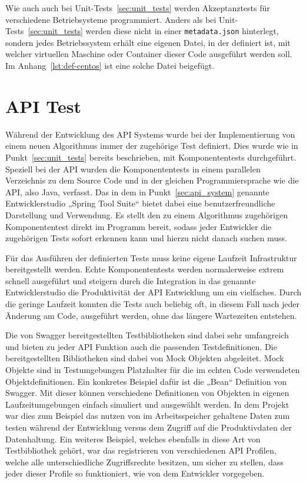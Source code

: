 Wie auch auch bei Unit-Tests~\ref{sec:unit_tests} werden Akzeptanztests für
verschiedene Betriebsysteme programmiert. Anders als bei
Unit-Tests~\ref{sec:unit_tests} werden diese nicht in einer
\texttt{metadata.json} hinterlegt, sondern jedes Betriebssystem erhält eine
eigenen Datei, in der definiert ist, mit welcher virtuellen Maschine oder
Container dieser Code ausgeführt werden soll. Im Anhang~\ref{lst:def-centos}
ist eine solche Datei beigefügt.
\mr%

\section{API Test}
\label{sec:api_test}
Während der Entwicklung des API Systems wurde bei der Implementierung von einem
neuen Algorithmus immer der zugehörige Test definiert. Dies wurde wie in
Punkt~\ref{sec:unit_tests} bereits beschrieben, mit Komponententests
durchgeführt. Speziell bei der API wurden die Komponententests in einem
parallelen Verzeichnis zu dem Source Code und in der gleichen
Programmiersprache wie die API, also Java, verfasst. Das in dem in
Punkt~\ref{sec:api_system} genannte Entwicklerstudio „Spring Tool Suite“ bietet
dabei eine benutzerfreundliche Darstellung und Verwendung. Es stellt den zu
einem Algorithmus zugehörigen Komponententest direkt im Programm bereit, sodass
jeder Entwickler die zugehörigen Tests sofort erkennen kann und hierzu nicht
danach suchen muss.

Für das Ausführen der definierten Tests muss keine eigene Laufzeit
Infrastruktur bereitgestellt werden. Echte Komponententests werden
normalerweise extrem schnell ausgeführt und steigern durch die Integration in
das genannte Entwicklerstudio die Produktivität der API Entwicklung um ein
vielfaches. Durch die geringe Laufzeit konnten die Tests auch beliebig oft, in
diesem Fall nach jeder Änderung am Code, ausgeführt werden, ohne das längere
Wartezeiten entstehen.

Die von Swagger bereitgestellten Testbibliotheken sind dabei sehr umfangreich
und bieten zu jeder API Funktion auch die passenden Testdefinitionen. Die
bereitgestellten Bibliotheken sind dabei von Mock Objekten abgeleitet. Mock
Objekte sind in Testumgebungen Platzhalter für die im echten Code verwendeten
Objektdefinitionen. Ein konkretes Beispiel dafür ist die „Bean“ Definition von
Swagger. Mit dieser können verschiedene Definitionen von Objekten in eigenen
Laufzeitumgebungen einfach simuliert und ausgewählt werden. In dem Projekt war
dies zum Beispiel das nutzen von im Arbeitsspeicher gehaltene Daten zum testen
während der Entwicklung versus dem Zugriff auf die Produktivdaten der
Datenhaltung. Ein weiteres Beispiel, welches ebenfalls in diese Art von
Testbibliothek gehört, war das registrieren von verschiedenen API Profilen,
welche alle unterschiedliche Zugriffsrechte besitzen, um sicher zu stellen,
dass jeder dieser Profile so funktioniert, wie von dem Entwickler vorgegeben.

